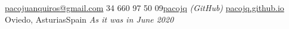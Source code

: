 \documentclass[10pt,a4paper]{article} %
\begin{document}
 



\noindent\href{mailto:pacojuanquiros@gmail.com}{pacojuanquiros@gmail.com}\bull %
\textsmaller{+}34 660 97 50 09\bull \href{http://www.github.com/pacojq}{pacojq} \textit{(GitHub)}\bull %
\href{http://pacojq.github.io}{pacojq.github.io} \\ %
Oviedo, Asturias\bull Spain \bull \textit{As it was in June 2020}%

\spacedhrule{0.9em}{-0.4em} %







\end{document}
